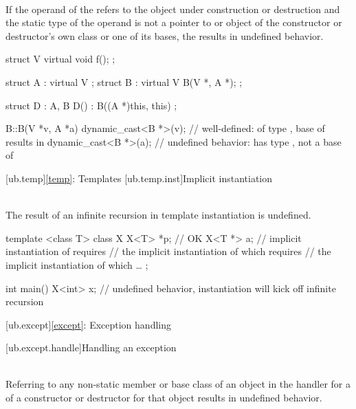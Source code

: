 \pnum
{} \\
If the operand of the
 refers to the object under construction or destruction and the static type of the operand is
not a pointer to or object of the constructor or destructor's own class or one of its bases, the 
results in undefined behavior.

\pnum
\begin{example}
\begin{codeblock}
struct V {
  virtual void f();
};

struct A : virtual V {};
struct B : virtual V {
  B(V *, A *);
};

struct D : A, B {
  D() : B((A *)this, this) {}
};

B::B(V *v, A *a) {
  dynamic_cast<B *>(v); // well-defined:  of type ,  base of  results in 
  dynamic_cast<B *>(a); // undefined behavior:  has type ,  not a base of 
}
\end{codeblock}
\end{example}


[ub.temp]{\ref{temp}: Templates}
[ub.temp.inst]{Implicit instantiation}

\pnum
{} \\
The result of an infinite recursion in template instantiation is undefined.

\pnum
\begin{example}
\begin{codeblock}
template <class T>
class X {
  X<T> *p;      // OK
  X<T *> a;     // implicit instantiation of  requires
                // the implicit instantiation of  which requires
                // the implicit instantiation of  which \ldots
};

int main() {
  X<int> x;     // undefined behavior, instantiation will kick off infinite recursion
}
\end{codeblock}
\end{example}


[ub.except]{\ref{except}: Exception handling}

[ub.except.handle]{Handling an exception}

\pnum
{} \\
Referring to any non-static member or base class of an object in the handler for a   of a
constructor or destructor for that object results in undefined behavior.

